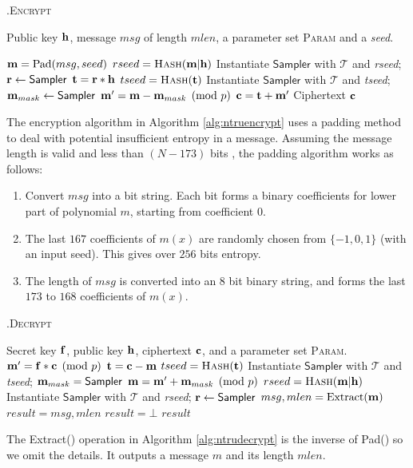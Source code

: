 \documentclass{llncs}
\newcommand{\bfc}{{\bf c}}
\newcommand{\bff}{{\bf f}}
\newcommand{\bfh}{{\bf h}}
\newcommand{\bfm}{{\bf m}}
\newcommand{\bfr}{{\bf r}}
\newcommand{\bft}{{\bf t}}
\newcommand{\ntrupke}{{\sf{ntru-pke}}}
\newcommand{\encrypt}{{\textsc{Encrypt}}}
\newcommand{\decrypt}{{\textsc{Decrypt}}}
\newcommand{\hash}{{\textsc{Hash}}}
\newcommand{\<}{\langle}
\renewcommand{\>}{\rangle}
\begin{document}
\begin{algorithm}[H]
\caption{\ntrupke.\encrypt}
\begin{algorithmic}[1]
\label{alg:ntruencrypt}
\REQUIRE Public key $\bfh$, message $msg$ of length $mlen$, a parameter set \textsc{Param} and a {\em seed}.

\STATE $\bfm = \text{Pad}(msg, seed)$
\STATE $rseed = \hash(\bfm|\bfh)$
\STATE Instantiate $\textsf{Sampler}$ with $\mathcal{T}$ and {\em rseed};
  \STATE $\bfr \gets \textsf{Sampler}$  
  \STATE $\bft = \bfr*\bfh$
    \STATE $tseed = \hash(\bft)$
   \STATE Instantiate $\textsf{Sampler}$ with $\mathcal{T}$ and {\em tseed}; 
  \STATE $\bfm_{mask} \gets \textsf{Sampler}$
  \STATE $\bfm' = \bfm - \bfm_{mask} \pmod{p}$
  \STATE $\bfc = \bft + \bfm'$
\ENSURE Ciphertext $\bfc$
\end{algorithmic}
\end{algorithm}

The encryption algorithm in Algorithm \ref{alg:ntruencrypt} uses a padding method to deal with potential
insufficient entropy in a message.
Assuming the message length is valid and less than
$(N-173)$ bits
, the padding algorithm works as follows:
\begin{enumerate}


\item Convert $msg$ into a bit string. Each bit forms a binary coefficients for lower part of polynomial $m$, starting from coefficient $0$.
\item The last $167$ coefficients of $m(x)$ are 
randomly chosen from $\{-1,0,1\}$ (with an input seed). This gives over 
$256$ bits entropy.
\item The length of $msg$ is converted into an $8$ bit binary string, and forms the last $173$ to $168$ coefficients of $m(x)$.    
\end{enumerate}


\begin{algorithm}
\caption{\ntrupke.\decrypt}
\begin{algorithmic}[1]
\label{alg:ntrudecrypt}
\REQUIRE Secret key $\bff$, public key $\bfh$, ciphertext $\bfc$, and a parameter set \textsc{Param}.
  \STATE $\bfm' = \bff*\bfc \pmod{p}$
  \STATE $\bft = \bfc - \bfm$
 \STATE $tseed = \hash(\bft)$
   \STATE Instantiate $\textsf{Sampler}$ with $\mathcal{T}$ and {\em tseed}; 
  \STATE $\bfm_{mask} = \textsf{Sampler}$
  \STATE $\bfm  = \bfm' + \bfm_{mask} \pmod{p}$
\STATE $rseed = \hash(\bfm|\bfh)$
\STATE Instantiate $\textsf{Sampler}$ with $\mathcal{T}$ and {\em rseed};
  \STATE $\bfr \gets \textsf{Sampler}$  
  \STATE $msg, mlen = \text{Extract}(\bfm)$
  \IF{$p\cdot \bfr*\bfh = \bft$}
  \STATE $result = msg, mlen$
  \ELSE
  \STATE $result = \bot$
  \ENDIF
  \ENSURE $result$
\end{algorithmic}
\end{algorithm}
The Extract() operation in Algorithm \ref{alg:ntrudecrypt}  is the inverse of Pad() so we omit the details. It
outputs a message $m$ and its length $mlen$.
\end{document}
